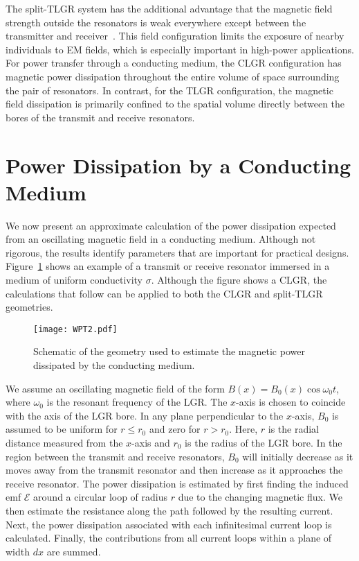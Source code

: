 \documentclass[conference]{IEEEtran}
\begin{document}
The split-TLGR system has the additional advantage that the magnetic field strength outside the resonators is weak everywhere except between the transmitter and receiver~\cite{Roberts:2020}.  This field configuration limits the exposure of nearby individuals to EM fields, which is especially important in high-power applications.  For power transfer through a conducting medium, the CLGR configuration has magnetic power dissipation throughout the entire volume of space surrounding the pair of resonators.  In contrast, for the TLGR configuration, the magnetic field dissipation is primarily confined to the spatial volume directly between the bores of the transmit and receive resonators.


\section{Power Dissipation by a Conducting Medium}\label{sec:dissipation}
We now present an approximate calculation of the power dissipation expected from an oscillating magnetic field in a conducting medium.  Although not rigorous, the results identify parameters that are important for practical designs.  Figure~\ref{fig:geometry} shows an example of a transmit or receive resonator  immersed in a medium of uniform conductivity $\sigma$.  Although the figure shows a CLGR, the calculations that follow can be applied to both the CLGR and split-TLGR geometries.
\begin{figure}[t]
\centerline{\texttt{[image: WPT2.pdf]}}
\caption{Schematic of the geometry used to estimate the magnetic power dissipated by the conducting medium.
}
\label{fig:geometry}
\end{figure}

We assume an oscillating magnetic field of the form \mbox{$B(x)=B_0(x)\cos\omega_0 t$}, where $\omega_0$ is the resonant frequency of the LGR. The $x$-axis is chosen to coincide with the axis of the LGR bore.  In any plane perpendicular to the $x$-axis, $B_0$ is assumed to be uniform for $r\le r_0$ and zero for $r>r_0$.  Here, $r$ is the radial distance measured from the $x$-axis and $r_0$ is the radius of the LGR bore.  In the region between the transmit and receive resonators, $B_0$ will initially decrease as it moves away from the transmit resonator and then increase as it approaches the receive resonator.  The power dissipation is estimated by first finding the induced emf $\mathcal{E}$ around a circular loop of radius $r$ due to the changing magnetic flux.  We then estimate the resistance along the path followed by the resulting current.  Next, the power dissipation associated with each infinitesimal current loop is calculated.  Finally, the contributions from all current loops within a plane of width $dx$ are summed.  
\end{document}
